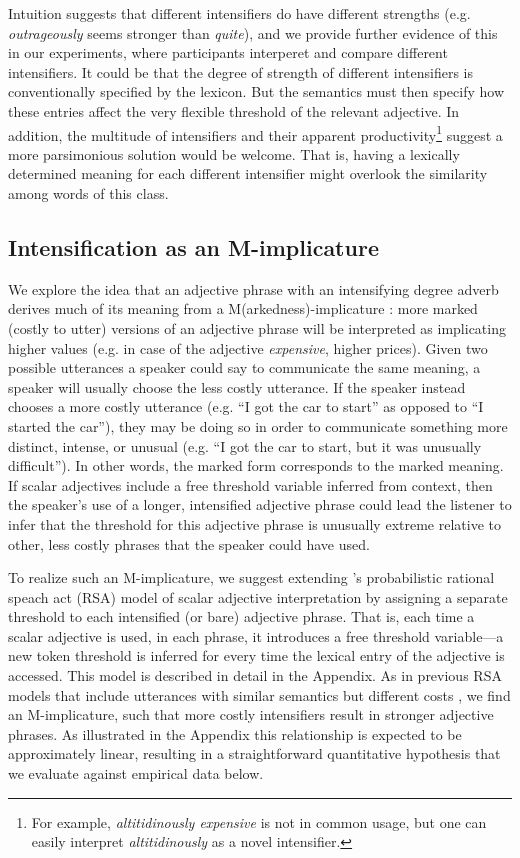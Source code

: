 \documentclass[10pt,letterpaper]{article}
\newcommand{\w}[1]{\emph{#1}}
\begin{document}
Intuition suggests that different intensifiers do have different strengths (e.g. \w{outrageously} seems stronger than \w{quite}), and we provide further evidence of this in our experiments, where participants interperet and compare different intensifiers.
It could be that the degree of strength of different intensifiers is conventionally specified by the lexicon. But the semantics must then specify how these entries affect the very flexible threshold of the relevant adjective.
In addition, the multitude of intensifiers \cite{bolinger} and their apparent productivity\footnote{For example, \w{altitidinously expensive} is not in common usage, but one can easily interpret \w{altitidinously} as a novel intensifier.}
suggest a more parsimonious solution would be welcome. 
That is, having a lexically determined meaning for each different intensifier might overlook the similarity among words of this class.

\subsection{Intensification as an M-implicature}

We explore the idea that an adjective phrase with an intensifying degree adverb derives much of its meaning from a M(arkedness)-implicature \cite{levinson}: more marked (costly to utter) versions of an adjective phrase will be interpreted as implicating higher values (e.g. in case of the adjective \w{expensive}, higher prices). 
Given two possible utterances a speaker could say to communicate the same meaning, a speaker will usually choose the less costly utterance. If the speaker instead chooses a more costly utterance (e.g. ``I got the car to start'' as opposed to ``I started the car''), they may be doing so in order to communicate something more distinct, intense, or unusual (e.g. ``I got the car to start, but it was unusually difficult''). In other words, the marked form corresponds to the marked meaning. If scalar adjectives include a free threshold variable inferred from context, then the speaker's use of a longer, intensified adjective phrase could lead the listener to infer that the threshold for this adjective phrase is unusually extreme relative to other, less costly phrases that the speaker could have used. 

To realize such an M-implicature, we suggest extending 's probabilistic rational speach act (RSA) model of scalar adjective interpretation by assigning a separate threshold to each intensified (or bare) adjective phrase. That is, each time a scalar adjective is used, in each phrase, it introduces a free threshold variable---a new token threshold is inferred for every time the lexical entry of the adjective is accessed.
This model is described in detail in the Appendix.
As in previous RSA models that include utterances with similar semantics but different costs \cite{bergen}, we find an M-implicature, such that more costly intensifiers result in stronger adjective phrases.
As illustrated in the Appendix this relationship is expected to be approximately linear, resulting in a straightforward quantitative hypothesis that we evaluate against empirical data below.
\end{document}
